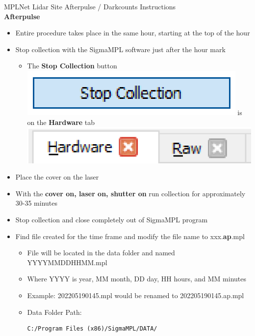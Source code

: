 \documentclass[11pt, oneside]{article}
\author{Jordan Greene}
\newenvironment{myitemize}
{ \begin{itemize}
    \setlength{\itemsep}{0pt}
    \setlength{\parskip}{0pt}
    \setlength{\parsep}{0pt}     }
{ \end{itemize}                  }
\begin{document}
\newcommand{\modular}[1]{\; \mbox{(mod $#1$)}}
\thispagestyle{empty}

\mbox{}
\setcounter{page}{1}
      
\noindent
MPLNet Lidar Site
\hfill Afterpulse / Darkcounts Instructions\\

\noindent\textbf{\LARGE Afterpulse}

\begin{myitemize}
\item Entire procedure takes place in the same hour, starting at the top of the hour
\item Stop collection with the SigmaMPL software just after the hour mark
\begin{myitemize}
\item The \textbf{Stop Collection} button \includegraphics[scale=0.3]{stopcollection_button.png} is on the 
	\textbf{Hardware} tab \includegraphics[scale=0.3]{hardware_tab.png}
\end{myitemize}
\item Place the cover on the laser
\item With the \textbf{cover on, laser on, shutter on} run collection for approximately 30-35 minutes
\item Stop collection and close completely out of SigmaMPL program
\item Find file created for the time frame and modify the file name to xxx.\textbf{ap}.mpl
\begin{myitemize}
\item File will be located in the data folder and named YYYYMMDDHHMM.mpl
\item Where YYYY is year, MM month, DD day, HH hours, and MM minutes
\item Example: 202205190145.mpl would be renamed to 202205190145.ap.mpl
\item Data Folder Path:\begin{verbatim}C:/Program Files (x86)/SigmaMPL/DATA/\end{verbatim}
\end{myitemize}

\end{myitemize}
\end{document}
